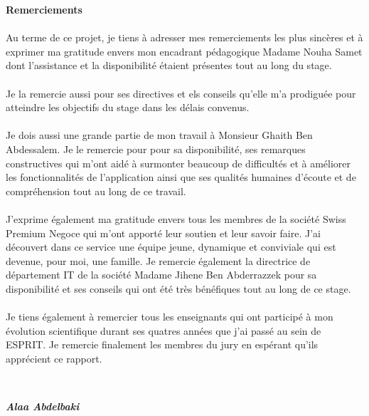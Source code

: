 \thispagestyle{plain}
\begin{center}
    \begin{huge}
        \textbf{Remerciements}
    \end{huge}
\end{center}
\vspace{2cm}
\begin{small}
    \paragraph{}
    \noindent Au terme de ce projet, je tiens à adresser mes remerciements les plus sincères et à exprimer ma gratitude envers mon encadrant pédagogique Madame Nouha Samet dont l'assistance et la disponibilité étaient présentes tout au long du stage.\\
    \paragraph{}
    \noindent Je la remercie aussi pour ses directives et els conseils qu'elle m'a prodiguée pour atteindre les objectifs du stage dans les délais convenus.
    \paragraph{}
    \noindent Je dois aussi une grande partie de mon travail à Monsieur Ghaith Ben Abdessalem. Je le remercie pour pour sa disponibilité, ses remarques constructives qui m'ont aidé à surmonter beaucoup de difficultés et à améliorer les fonctionnalités de l'application ainsi que ses qualités humaines d'écoute et de compréhension tout au long de ce travail.
    \paragraph{}
    \noindent J'exprime également ma gratitude envers tous les membres de la société Swiss Premium Negoce qui m'ont apporté leur soutien et leur savoir faire. J'ai découvert dans ce service une équipe jeune, dynamique et conviviale qui est devenue, pour moi, une famille. Je remercie également la directrice de département IT de la société Madame Jihene Ben Abderrazzek pour sa disponibilité et ses conseils qui ont été très bénéfiques tout au long de ce stage.
    \paragraph{}
    Je tiens également à remercier tous les enseignants qui ont participé à mon évolution scientifique durant ses quatres années que j'ai passé au sein de ESPRIT. Je remercie finalement les membres du jury en espérant qu'ils apprécient ce rapport.
\end{small} \\
\bigbreak
\begin{flushright}
    \textbf{\textit{Alaa Abdelbaki}}
\end{flushright}